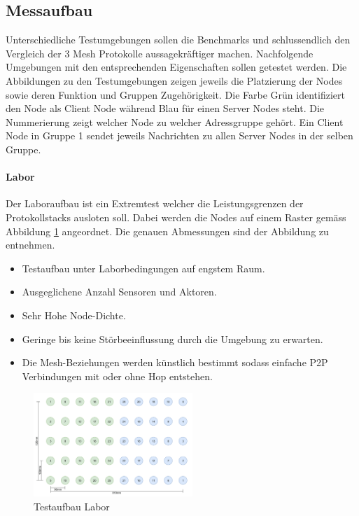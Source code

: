 \subsection{Messaufbau}
Unterschiedliche Testumgebungen sollen die Benchmarks und schlussendlich den Vergleich der 3 Mesh Protokolle aussagekräftiger machen. Nachfolgende Umgebungen mit den entsprechenden Eigenschaften sollen getestet werden. Die Abbildungen zu den Testumgebungen zeigen jeweils die Platzierung der Nodes sowie deren Funktion und Gruppen Zugehörigkeit. Die Farbe Grün identifiziert den Node als Client Node während Blau für einen Server Nodes steht. Die Nummerierung zeigt welcher Node zu welcher Adressgruppe gehört. Ein Client Node in Gruppe 1 sendet jeweils Nachrichten zu allen Server Nodes in der selben Gruppe.

\paragraph{Labor}
Der Laboraufbau ist ein Extremtest welcher die Leistungsgrenzen der Protokollstacks ausloten soll. Dabei werden die Nodes auf einem Raster gemäss Abbildung \ref{fig:TestaufbauLabor} angeordnet. Die genauen Abmessungen sind der Abbildung zu entnehmen.

\begin{itemize}
	\item Testaufbau unter Laborbedingungen auf engstem Raum.
	\item Ausgeglichene Anzahl Sensoren und Aktoren.
	\item Sehr Hohe Node-Dichte.
	\item Geringe bis keine Störbeeinflussung durch die Umgebung zu erwarten.
	\item Die Mesh-Beziehungen werden künstlich bestimmt sodass einfache P2P Verbindungen mit oder ohne Hop entstehen.
\end{itemize}

\begin{figure}[h]
	\centering
	\includegraphics[width=6cm]{graphics/Testaufbau_Labor.png}
	\caption{Testaufbau Labor}
	\label{fig:TestaufbauLabor}
\end{figure}

